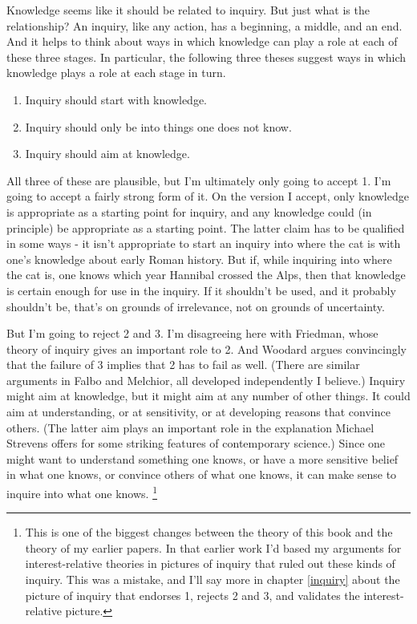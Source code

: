 \documentclass[
  11pt,
]{book}
\providecommand{\tightlist}{%
  \setlength{\itemsep}{0pt}\setlength{\parskip}{0pt}}
\begin{document}
Knowledge seems like it should be related to inquiry. But just what is the relationship? An inquiry, like any action, has a beginning, a middle, and an end. And it helps to think about ways in which knowledge can play a role at each of these three stages. In particular, the following three theses suggest ways in which knowledge plays a role at each stage in turn.

\begin{enumerate}
\def\labelenumi{\arabic{enumi}.}
\tightlist
\item
  Inquiry should start with knowledge.
\item
  Inquiry should only be into things one does not know.
\item
  Inquiry should aim at knowledge.
\end{enumerate}

All three of these are plausible, but I'm ultimately only going to accept 1. I'm going to accept a fairly strong form of it. On the version I accept, only knowledge is appropriate as a starting point for inquiry, and any knowledge could (in principle) be appropriate as a starting point. The latter claim has to be qualified in some ways - it isn't appropriate to start an inquiry into where the cat is with one's knowledge about early Roman history. But if, while inquiring into where the cat is, one knows which year Hannibal crossed the Alps, then that knowledge is certain enough for use in the inquiry. If it shouldn't be used, and it probably shouldn't be, that's on grounds of irrelevance, not on grounds of uncertainty.

But I'm going to reject 2 and 3. I'm disagreeing here with Friedman, whose theory of inquiry gives an important role to 2. And Woodard argues convincingly that the failure of 3 implies that 2 has to fail as well. (There are similar arguments in Falbo and Melchior, all developed independently I believe.) Inquiry might aim at knowledge, but it might aim at any number of other things. It could aim at understanding, or at sensitivity, or at developing reasons that convince others. (The latter aim plays an important role in the explanation Michael Strevens \citeyearpar{Strevens2020} offers for some striking features of contemporary science.) Since one might want to understand something one knows, or have a more sensitive belief in what one knows, or convince others of what one knows, it can make sense to inquire into what one knows. \footnote{This is one of the biggest changes between the theory of this book and the theory of my earlier papers. In that earlier work I'd based my arguments for interest-relative theories in pictures of inquiry that ruled out these kinds of inquiry. This was a mistake, and I'll say more in chapter \ref{inquiry} about the picture of inquiry that endorses 1, rejects 2 and 3, and validates the interest-relative picture.}
\end{document}
